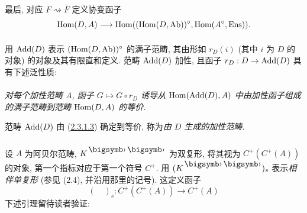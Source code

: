 最后, 对应 $F\rightsquigarrow\bar F$ 定义协变函子
$$
\Hom(D,A)\to\Hom((\Hom(D,\Ab))^{\circ},
\Hom(A^{\circ},\Ens)){\quoi}.
$$

\paragraph{}
用 $\operatorname{Add}(D)$ 表示 $(\operatorname{Hom}(D,\operatorname{Ab}))^{\circ}$ 的满子范畴,
其由形如 $r_D(i)$ (其中 $i$ 为 $D$ 的对象) 的对象及其有限直和定义.
范畴 $\operatorname{Add}(D)$ 加性, 且函子 $r_D:D\to\Add(D)$ 具有下述泛性质:

\paragraph{}
\emph{对每个加性范畴 $A$, 函子 $G\longmapsto G\circ r_D$
诱导从 $\operatorname{Hom}(\operatorname{Add}(D),A)$ 中由加性函子组成的满子范畴到范畴 $\operatorname{Hom}(D,A)$ 的等价.}

范畴 $\operatorname{Add}(D)$ 由 (\hyperref[Vbis.par2.3.1.3]{2.3.1.3}) 确定到等价,
称为\emph{由 $D$ 生成的加性范畴}.



\subsubsection{}
设 $A$ 为阿贝尔范畴, $K^{\bigdot\bigdot}$ 为双复形,
将其视为 $C^{+}(C^+(A))$ 的对象, 第一个指标对应于第一个\pageoriginale{}符号 $C^+$.
用 $(K^{\bigdot\bigdot})_s$ 表示\emph{相伴单复形}
(参见  (2.4), 并沿用那里的记号).
这定义函子
\begin{equation*}
(\quad)_s:C^+(C^+(A))\to C^+(A)\tag{2.3.2.1}
\end{equation*}
下述引理留待读者验证:

